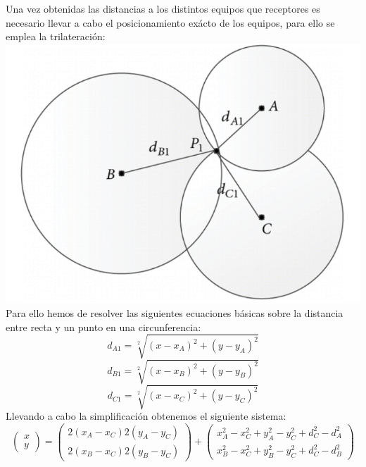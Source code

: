 \documentclass[a4paper ,12pt, onecolumn]{article}
\begin{document}
            Una vez obtenidas las distancias a los distintos equipos que receptores es necesario llevar a cabo el
            posicionamiento exácto de los equipos, para ello se emplea la trilateración:
            \includegraphics[scale=0.3]{trilateration_circle.png}
            Para ello hemos de resolver las siguientes ecuaciones básicas sobre la distancia entre recta y un punto en 
                una circunferencia:
                \begin{equation}
                    d_{A1}= \sqrt[2]{(x-x_A)^2+(y-y_A)^2}
                \end{equation}
                \begin{equation}
                    d_{B1}= \sqrt[2]{(x-x_B)^2+(y-y_B)^2}
                \end{equation}
                \begin{equation}
                    d_{C1}= \sqrt[2]{(x-x_C)^2+(y-y_C)^2}
                \end{equation}
                Llevando a cabo la simplificación obtenemos el siguiente sistema:
                \begin{equation}
                    \begin{pmatrix}
                        x \\
                        y 
                    \end{pmatrix}=
                    \begin{pmatrix}
                        2(x_A-x_C) 2(y_A-y_C) \\
                        2(x_B-x_C) 2(y_B-y_C) 
                    \end{pmatrix} 
                    +
                    \begin{pmatrix}
                        x_A^2-x_C^2+y_A^2-y_C^2+d_C^2-d_A^2 \\
                        x_B^2-x_C^2+y_B^2-y_C^2+d_C^2-d_B^2 
                    \end{pmatrix} 
                \end{equation}
\end{document}
